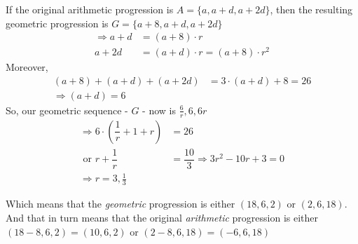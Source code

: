 \begin{solution}[\fullpage]
	If the original arithmetic progression is $A = \lbrace a, a + d, a+2d\rbrace$, then the
	resulting geometric progression is $G = \lbrace a + 8, a + d, a + 2d \rbrace$
	\begin{align}
		\Rightarrow a +d &= (a+8)\cdot r \\
		a + 2d &= (a+d)\cdot r = (a + 8)\cdot r^2 
	\end{align}
	Moreover, 
	\begin{align}
		(a+8) + (a+d)+(a+2d) &= 3\cdot(a+d) + 8 = 26 \\
		\Rightarrow (a+d) = 6
	\end{align}
	So, our geometric sequence - $G$ - now is $\frac{6}{r}, 6, 6r$
	\begin{align}
		\Rightarrow 6\cdot\left( \dfrac{1}{r} + 1 + r\right) &= 26 \\
		\text{ or } r + \dfrac{1}{r} &= \dfrac{10}{3} \Rightarrow 3r^2-10r+3 = 0 \\
		\Rightarrow r = 3, \frac{1}{3}
	\end{align}
	
	Which means that the \textit{geometric} progression is either $(18,6,2)$ or $(2,6,18)$.
	And that in turn means that the original \textit{arithmetic} progression is either
	$(18-8,6,2) = (10,6,2)$ or $(2-8,6,18) = (-6,6,18)$
\end{solution}
